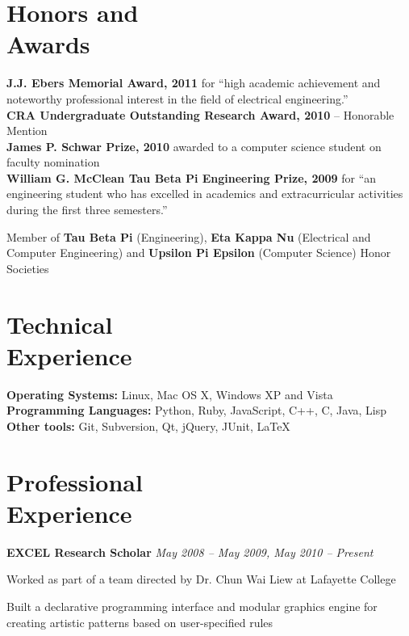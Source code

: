 \documentclass[margin,line]{resume}
\begin{document}
\begin{resume}
    \section{Honors and\\Awards} 

    {\bf J.J. Ebers Memorial Award, 2011} for ``high academic achievement and noteworthy professional
    interest in the field of electrical engineering.''\\
    {\bf CRA Undergraduate Outstanding Research Award, 2010} -- Honorable Mention \\
    {\bf James P. Schwar Prize, 2010} awarded to a computer science student on faculty nomination \\
    {\bf William G. McClean Tau Beta Pi Engineering Prize, 2009} for ``an engineering student who has excelled in academics and extracurricular activities during the first three semesters.''
    
    Member of {\bf Tau Beta Pi} (Engineering), {\bf Eta Kappa Nu} (Electrical and Computer Engineering)
    and {\bf Upsilon Pi Epsilon} (Computer Science) Honor Societies

    \section{Technical\\ Experience}
    {\bf Operating Systems:} Linux, Mac OS X, Windows XP and Vista\\
    {\bf Programming Languages:} Python, Ruby, JavaScript, C++, C, Java, Lisp\\
    {\bf Other tools:} Git, Subversion, Qt, jQuery, JUnit, \LaTeX 

    \section{Professional\\Experience} 
    {\bf EXCEL Research Scholar} \hfill   {\sl May 2008 -- May 2009, May 2010 -- Present}
    \begin{list2}
    	\item Worked as part of a team directed by Dr. Chun Wai Liew at Lafayette College
    	\item Built a declarative programming interface and modular graphics engine for creating
          artistic patterns based on user-specified rules
    \end{list2}


\end{resume}
\end{document}
